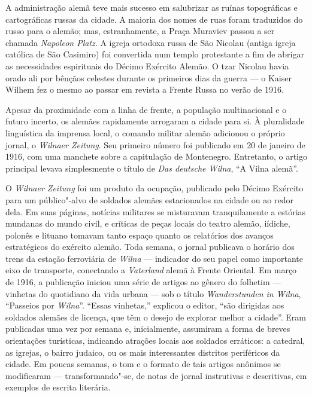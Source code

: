A administração alemã teve mais sucesso em salubrizar as ruínas
topográficas e cartográficas russas da cidade. A maioria dos nomes de
ruas foram traduzidos do russo para o alemão; mas, estranhamente, a
Praça Muraviev passou a ser chamada \textit{Napoleon Platz}. A igreja
ortodoxa russa de São Nicolau (antiga igreja católica de São Casimiro)
foi convertida num templo protestante a fim de abrigar as necessidades
espirituais do Décimo Exército Alemão. O tzar Nicolau  havia orado ali
por bênçãos celestes durante os primeiros dias da guerra --- o Kaiser
Wilhem  fez o mesmo ao passar em revista a Frente Russa no verão de
1916.

\asterisc

Apesar da proximidade com a linha de frente, a população multinacional e
o futuro incerto, os alemães rapidamente arrogaram a cidade para si. À
pluralidade linguística da imprensa local, o comando militar alemão
adicionou o próprio jornal, o \textit{Wilnaer Zeitung}. Seu primeiro
número foi publicado em 20 de janeiro de 1916, com uma manchete sobre a
capitulação de Montenegro. Entretanto, o artigo principal levava
simplesmente o título de \textit{Das deutsche Wilna}, ``A Vilna alemã''.

O \textit{Wilnaer Zeitung} foi um produto da ocupação, publicado pelo
Décimo Exército para um público"-alvo de soldados alemães estacionados na
cidade ou ao redor dela. Em suas páginas, notícias militares se
misturavam tranquilamente a estórias mundanas do mundo civil, e críticas
de peças locais do teatro alemão, iídiche, polonês e lituano tomavam
tanto espaço quanto os relatórios dos avanços estratégicos do exército
alemão. Toda semana, o jornal publicava o horário dos trens da estação
ferroviária de \textit{Wilna} --- indicador do seu papel como importante eixo de
transporte, conectando a \textit{Vaterland} alemã à Frente Oriental. Em
março de 1916, a publicação iniciou uma série de artigos ao gênero do
folhetim --- vinhetas do quotidiano da vida urbana --- sob o título
\textit{Wanderstunden in Wilna}, ``Passeios por \textit{Wilna}''. ``Essas vinhetas,''
explicou o editor, ``são dirigidas aos soldados alemães de licença, que
têm o desejo de explorar melhor a cidade''. Eram publicadas uma vez por
semana e, inicialmente, assumiram a forma de breves orientações
turísticas, indicando atrações locais aos soldados erráticos: a
catedral, as igrejas, o bairro judaico, ou os mais interessantes
distritos periféricos da cidade. Em poucas semanas, o tom e o formato de
tais artigos anônimos se modificaram --- transformando"-se, de notas de
jornal instrutivas e descritivas, em exemplos de escrita literária.

